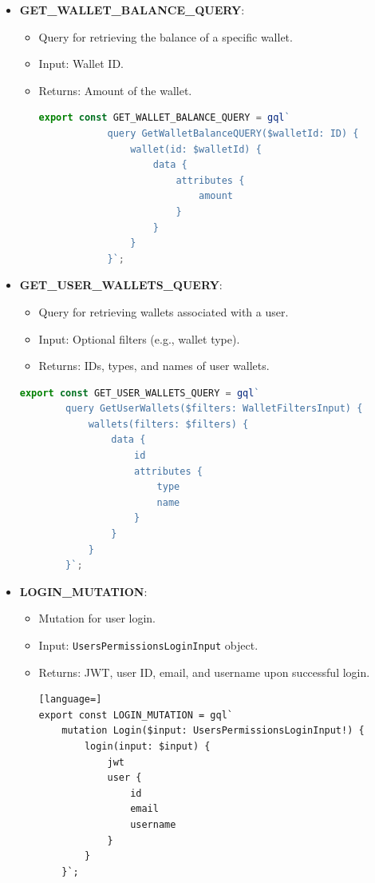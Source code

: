 \begin{itemize}
    \item \textbf{GET\_WALLET\_BALANCE\_QUERY}:
    \begin{itemize}
        \item Query for retrieving the balance of a specific wallet.
        \item Input: Wallet ID.
        \item Returns: Amount of the wallet.
        \begin{lstlisting}[language=TypeScript]
        export const GET_WALLET_BALANCE_QUERY = gql`
            query GetWalletBalanceQUERY($walletId: ID) {
                wallet(id: $walletId) {
                    data {
                        attributes {
                            amount
                        }
                    }
                }
            }`;
        \end{lstlisting}
    \end{itemize}
    
    \item \textbf{GET\_USER\_WALLETS\_QUERY}:
    \begin{itemize}
        \item Query for retrieving wallets associated with a user.
        \item Input: Optional filters (e.g., wallet type).
        \item Returns: IDs, types, and names of user wallets.
    \end{itemize}
    \begin{lstlisting}[language=TypeScript]
    export const GET_USER_WALLETS_QUERY = gql`
        query GetUserWallets($filters: WalletFiltersInput) {
            wallets(filters: $filters) {
                data {
                    id
                    attributes {
                        type
                        name
                    }
                }
            }
        }`;
\end{lstlisting}
    \item \textbf{LOGIN\_MUTATION}:
    \begin{itemize}
        \item Mutation for user login.
        \item Input: \texttt{UsersPermissionsLoginInput} object.
        \item Returns: JWT, user ID, email, and username upon successful login.
        \begin{lstlisting}[language=]
export const LOGIN_MUTATION = gql`
    mutation Login($input: UsersPermissionsLoginInput!) {
        login(input: $input) {
            jwt
            user {
                id
                email
                username
            }
        }
    }`;
\end{lstlisting}
    \end{itemize}
    

\end{itemize}
